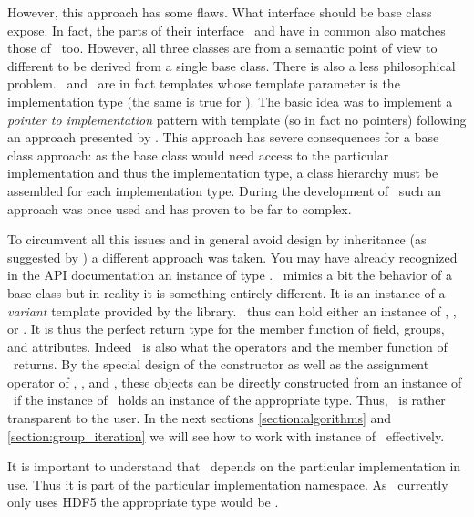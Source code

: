 However, this approach has some flaws. What interface should be base class
expose. In fact, the parts of their interface \nxfield\ and \nxgroup have in
common also matches those of \nxattribute\ too. However, all three classes are
from a semantic point of view to different to be derived from a single base
class.  There is also a less philosophical problem. \nxfield\ and \nxgroup\ are
in fact templates whose template parameter is the implementation type (the same
is true for \nxattribute). The basic idea was to implement a \emph{pointer to
implementation} pattern with template (so in fact no pointers) following an
approach presented by \cite{vandevoorde:2002}. This approach has severe
consequences for a base class approach: as the base class would need access to
the particular implementation and thus the implementation type, a class 
hierarchy must be assembled for each implementation type. During the 
development of \libpniio\ such an approach was once used and has proven to be 
far to complex. 

To circumvent all this issues and in general avoid design by inheritance (as
suggested by \cite{gof:1995}) a different approach was taken. You may have
already recognized in the API documentation an instance of type \nxobject. 
\nxobject\ mimics a bit the behavior of a base class but in reality it is
something entirely different. It is an instance of a \emph{variant} template 
provided by the  library.
\nxobject\ thus can hold either an instance of \nxgroup, \nxfield, or
\nxattribute. It is thus the perfect return type for the  
member function of field, groups, and attributes. Indeed \nxobject\ is also what
the \cpp{[]} operators and the  member function of \nxgroup\ returns. 
By the special design of the constructor as well as the assignment operator
of \nxfield, \nxgroup, and \nxattribute, these objects can be directly
constructed from an instance of \nxobject\ if the instance of \nxobject\ holds
an instance of the appropriate type. 
Thus, \nxobject\ is rather transparent to the user. 
In the next sections \ref{section:algorithms} and \ref{section:group_iteration}
we will see how to work with instance of \nxobject\ effectively.

It is important to understand that \nxobject\ depends on the particular
implementation in use. Thus it is part of the particular implementation
namespace. As \libpniio\ currently only uses HDF5 the appropriate type would be 
.

